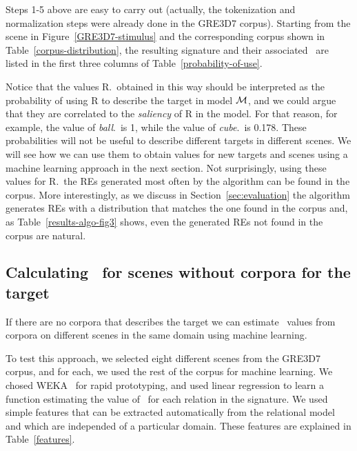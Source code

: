 Steps 1-5 above are easy to carry out (actually, the tokenization and normalization steps were already done in the GRE3D7 corpus). Starting from the scene in Figure~\ref{GRE3D7-stimulus} and the corresponding corpus shown in Table~\ref{corpus-distribution}, the resulting signature and their associated \puse\ are listed in the first three columns of Table~\ref{probability-of-use}. 

Notice that the values R.\puse\ obtained in this way should be interpreted as the probability of using R to describe the target in model $\mathcal{M}$, and we could argue that they are correlated to the \emph{saliency} of R in the model.  
For that reason, for example, the value of \emph{ball}.\puse\ is 1, while the value of \emph{cube}.\puse\ is 0.178.  These probabilities will not be useful to describe different targets in different scenes.  We will see how we can use them to obtain values for new targets and scenes using a machine learning approach in the next section.  Not surprisingly, using these values for R.\puse\ the REs generated most often by the algorithm can be found in the corpus.  More interestingly, as we discuss in Section~\ref{sec:evaluation} the algorithm generates REs with a distribution that matches the one found in the corpus and, as Table~\ref{results-algo-fig3} shows, even the generated REs not found in the corpus are natural.    


\subsection{Calculating \puse\ for scenes without corpora for the target} \label{subsec:learning}

If there are no corpora that describes the target we can estimate  \puse\ values from corpora on different scenes in the same domain using machine learning. 

To test this approach, we selected eight different scenes from the GRE3D7 corpus, and for each, we used the rest of the corpus for machine learning. We chosed WEKA~\cite{Hall:WEK09} for rapid prototyping, and used linear regression to learn a function estimating the value of \puse\ for each relation in the signature.  We used simple features that can be extracted automatically from the relational model and which are independed of a particular domain. These features are explained in Table~\ref{features}.  

